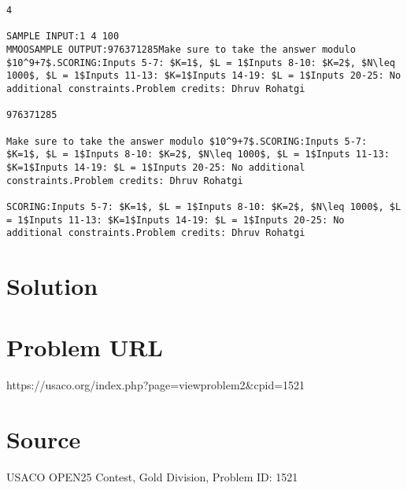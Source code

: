 \documentclass[12pt]{article}
\begin{document}
\begin{verbatim}
4

SAMPLE INPUT:1 4 100
MMOOSAMPLE OUTPUT:976371285Make sure to take the answer modulo $10^9+7$.SCORING:Inputs 5-7: $K=1$, $L = 1$Inputs 8-10: $K=2$, $N\leq 1000$, $L = 1$Inputs 11-13: $K=1$Inputs 14-19: $L = 1$Inputs 20-25: No additional constraints.Problem credits: Dhruv Rohatgi

976371285

Make sure to take the answer modulo $10^9+7$.SCORING:Inputs 5-7: $K=1$, $L = 1$Inputs 8-10: $K=2$, $N\leq 1000$, $L = 1$Inputs 11-13: $K=1$Inputs 14-19: $L = 1$Inputs 20-25: No additional constraints.Problem credits: Dhruv Rohatgi

SCORING:Inputs 5-7: $K=1$, $L = 1$Inputs 8-10: $K=2$, $N\leq 1000$, $L = 1$Inputs 11-13: $K=1$Inputs 14-19: $L = 1$Inputs 20-25: No additional constraints.Problem credits: Dhruv Rohatgi
\end{verbatim}

\section*{Solution}


\section*{Problem URL}
https://usaco.org/index.php?page=viewproblem2&cpid=1521

\section*{Source}
USACO OPEN25 Contest, Gold Division, Problem ID: 1521
\end{document}
